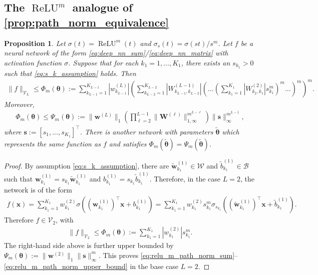 \documentclass{article}
\DeclareMathOperator{\ReLU}{\mathrm{ReLU}}
\def\vtheta{{\bm{\theta}}}
\def\vs{{\bm{s}}}
\def\vw{{\bm{w}}}
\def\vx{{\bm{x}}}
\def\mW{{\bm{W}}}
\def\cB{{\mathcal{B}}}
\def\cV{{\mathcal{V}}}
\def\cW{{\mathcal{W}}}
\newtheorem{proposition}[theorem]{Proposition}
\begin{document}
\begin{appendices}
\subsection{The $\ReLU^m$ analogue of \cref{prop:path_norm_equivalence}} \label{appendix:relu_m_path_norm_equivalence}
\begin{proposition} \label{prop:relu_m_path_norm_equivalence}
    Let $\sigma(t) = \ReLU^m(t)$ and $\sigma_s(t) = \sigma(st)/s^m$. Let $f$ be a neural network of the form \eqref{eq:deep_nn_sum}/\eqref{eq:deep_nn_matrix} with activation function $\sigma$. Suppose that for each $k_1 = 1, \dots, K_1$, there exists an $s_{k_1} > 0$ such that \eqref{eq:s_k_assumption} holds. Then
    \begin{align} \label{eq:relu_m_path_norm_sum}
        \| f \|_{\cV_L} \leq \Phi_m(\vtheta) := \sum_{k_{L-1}=1}^{K_{L-1}} \left| w_{k_{L-1}}^{(L)} \right| \left( \sum_{k_{L-2}=1}^{K_{L-2}} \left| W_{k_{L-1},k_{L-2}}^{(L-1)} \right| \left( \dots \left( \sum_{k_1=1}^{K_1}  \left| W_{k_2,k_1}^{(2)} \right| s_{k_1}^m \right)^m \dots \right)^m \right)^m.
    \end{align}
    Moreover,
    \begin{align} \label{eq:relu_m_path_norm_upper_bound}
        \Phi_m(\vtheta) \leq \Psi_m(\vtheta) := \| \vw^{(L)} \|_1 \left( \prod_{\ell=2}^{L-1} \| \mW^{(\ell)} \|_{1,\infty}^{m^{L-\ell}} \right) \| \vs \|_\infty^{m^{L-1}},
    \end{align}
    where $\vs := [s_1, \dots, s_{K_1}]^\top$. There is another network with parameters $\widetilde{\vtheta}$ which represents the same function as $f$ and satisfies $\Phi_m(\widetilde{\vtheta}) = \Psi_m(\widetilde{\vtheta})$.
\end{proposition}
\begin{proof}
    By assumption \eqref{eq:s_k_assumption}, there are $\widetilde{\vw}_{k_1}^{(1)} \in \cW$ and $\widetilde{b}_{k_1}^{(1)} \in \cB$ such that $\vw_{k_1}^{(1)} = s_{k_1} \widetilde{\vw}_{k_1}^{(1)}$ and $b_{k_1}^{(1)} = s_{k_1} \widetilde{b}_{k_1}^{(1)}$. Therefore, in the case $L = 2$, the network is of the form
    \begin{align}
        f(\vx) = \sum_{k_1=1}^{K_1} w_{k_1}^{(2)} \sigma \left( (\vw_{k_1}^{(1)})^\top \vx + b_{k_1}^{(1)} \right) = \sum_{k_1=1}^{K_1} w_{k_1}^{(2)} s_{k_1}^m \sigma_{s_{k_1}} \left( ( \widetilde{\vw}_{k_1}^{(1)})^\top \vx + \widetilde{b}_{k_1}^{(1)} \right).
    \end{align}
    Therefore $f \in \cV_2$, with
    \begin{align}
        \| f \|_{\cV_2} \leq \Phi_m(\vtheta) := \sum_{k_1=1}^{K_1} \left| w_{k_1}^{(2)} \right| s_{k_1}^m.
    \end{align}
    The right-hand side above is further upper bounded by $\Psi_m(\vtheta) := \| \vw^{(2)} \|_1 \| \vs \|_\infty^m$. This proves \eqref{eq:relu_m_path_norm_sum}--\eqref{eq:relu_m_path_norm_upper_bound} in the base case $L=2$.
    

\end{proof}
\end{appendices}
\end{document}
